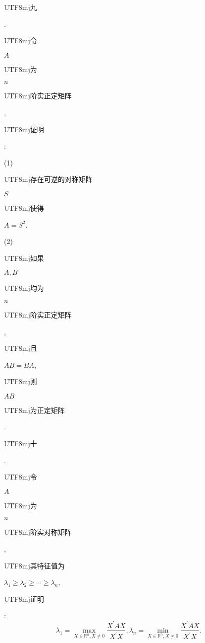 \documentclass[10pt]{article}
\begin{document}
\begin{CJK}{UTF8}{mj}九\end{CJK}. \begin{CJK}{UTF8}{mj}令\end{CJK} $A$ \begin{CJK}{UTF8}{mj}为\end{CJK} $n$ \begin{CJK}{UTF8}{mj}阶实正定矩阵\end{CJK}, \begin{CJK}{UTF8}{mj}证明\end{CJK}:

(1) \begin{CJK}{UTF8}{mj}存在可逆的对称矩阵\end{CJK} $S$ \begin{CJK}{UTF8}{mj}使得\end{CJK} $A=S^{2}$.

(2) \begin{CJK}{UTF8}{mj}如果\end{CJK} $A, B$ \begin{CJK}{UTF8}{mj}均为\end{CJK} $n$ \begin{CJK}{UTF8}{mj}阶实正定矩阵\end{CJK}, \begin{CJK}{UTF8}{mj}且\end{CJK} $A B=B A$, \begin{CJK}{UTF8}{mj}则\end{CJK} $A B$ \begin{CJK}{UTF8}{mj}为正定矩阵\end{CJK}.

\begin{CJK}{UTF8}{mj}十\end{CJK}. \begin{CJK}{UTF8}{mj}令\end{CJK} $A$ \begin{CJK}{UTF8}{mj}为\end{CJK} $n$ \begin{CJK}{UTF8}{mj}阶实对称矩阵\end{CJK}, \begin{CJK}{UTF8}{mj}其特征值为\end{CJK} $\lambda_{1} \geqslant \lambda_{2} \geqslant \cdots \geqslant \lambda_{n}$, \begin{CJK}{UTF8}{mj}证明\end{CJK}:
$$
\lambda_{1}=\max _{X \in \mathbb{R}^{n}, X \neq 0} \frac{X^{\prime} A X}{X^{\prime} X}, \lambda_{n}=\min _{X \in \mathbb{R}^{n}, X \neq 0} \frac{X^{\prime} A X}{X^{\prime} X} .
$$
\end{document}
